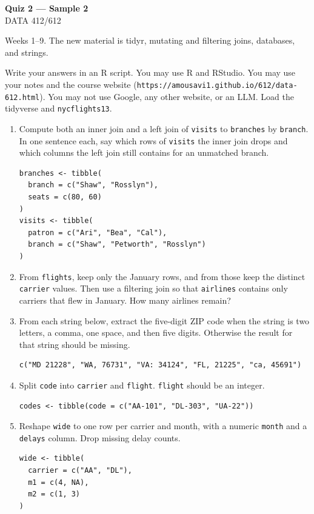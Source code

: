 \documentclass[11pt]{article}
\begin{document}
\begin{center}
{\LARGE\bfseries Quiz 2 --- Sample 2}\\[0.35em]
DATA 412/612
\end{center}

\vspace{0.25em}

Weeks 1--9. The new material is tidyr, mutating and filtering
joins, databases, and strings.

Write your answers in an R script. You may use R and RStudio.
You may use your notes and the course website
(\texttt{https://amousavi1.github.io/612/data-612.html}).
You may not use Google, any other website, or an LLM.
Load the tidyverse and \texttt{nycflights13}.

\begin{enumerate}
\item Compute both an inner join and a left join of \texttt{visits}
to \texttt{branches} by \texttt{branch}.
In one sentence each, say which rows of \texttt{visits} the inner
join drops and which columns the left join still contains for an
unmatched branch.

\begin{lstlisting}
branches <- tibble(
  branch = c("Shaw", "Rosslyn"),
  seats = c(80, 60)
)
visits <- tibble(
  patron = c("Ari", "Bea", "Cal"),
  branch = c("Shaw", "Petworth", "Rosslyn")
)
\end{lstlisting}

\item From \texttt{flights}, keep only the January rows, and from
those keep the distinct \texttt{carrier} values.
Then use a filtering join so that \texttt{airlines} contains only
carriers that flew in January.
How many airlines remain?

\item From each string below, extract the five-digit ZIP code when
the string is two letters, a comma, one space, and then five digits.
Otherwise the result for that string should be missing.

\begin{lstlisting}
c("MD 21228", "WA, 76731", "VA: 34124", "FL, 21225", "ca, 45691")
\end{lstlisting}

\item Split \texttt{code} into \texttt{carrier} and \texttt{flight}.
\texttt{flight} should be an integer.

\begin{lstlisting}
codes <- tibble(code = c("AA-101", "DL-303", "UA-22"))
\end{lstlisting}

\item Reshape \texttt{wide} to one row per carrier and month, with a
numeric \texttt{month} and a \texttt{delays} column. Drop missing
delay counts.

\begin{lstlisting}
wide <- tibble(
  carrier = c("AA", "DL"),
  m1 = c(4, NA),
  m2 = c(1, 3)
)
\end{lstlisting}
\end{enumerate}
\end{document}
